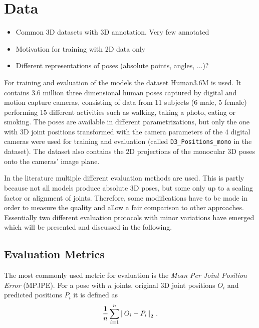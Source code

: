 \section{Data}
\label{sec:data}

\begin{itemize}
	\item Common 3D datasets with 3D annotation. Very few annotated
	\item Motivation for training with 2D data only
	\item Different representations of poses (absolute points, angles, ...)?
\end{itemize}
 

For training and evaluation of the models the dataset Human3.6M \cite{ionescu14} is used. 
It contains 3.6 million three dimensional human poses captured by digital and motion capture cameras, consisting of data from 11 subjects (6 male, 5 female) performing 15 different activities such as walking, taking a photo, eating or smoking.
The poses are available in different parametrizations, but only the one with 3D joint positions transformed with the camera parameters of the 4 digital cameras were used for training and evaluation (called \texttt{D3\_Positions\_mono} in the dataset).
The dataset also contains the 2D projections of the monocular 3D poses onto the cameras' image plane.


In the literature multiple different evaluation methods are used. 
This is partly because not all models produce absolute 3D poses, but some only up to a scaling factor or alignment of joints.
Therefore, some modifications have to be made in order to measure the quality and allow a fair comparison to other approaches.
Essentially two different evaluation protocols with minor variations have emerged which will be presented and discussed in the following.

\subsection{Evaluation Metrics}
The most commonly used metric for evaluation is the \textit{Mean Per Joint Position Error} (MPJPE).
For a pose with $n$ joints, original 3D joint positions $O_i$ and predicted positions $P_i$ it is defined as
\begin{equation}
	\frac{1}{n} \sum_{i = 1}^{n}  \norm{O_i - P_i}_2 \ .
\end{equation}

